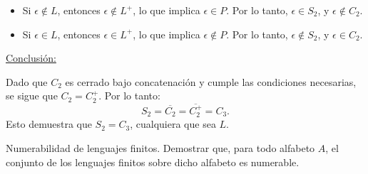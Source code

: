 \documentclass[12pt]{book} %
\begin{document}
\begin{solucion}
\begin{enumerate}[label=\alph*)]
    \begin{itemize}
         \item Si $\epsilon \notin L$, entonces $\epsilon \notin L^+$, lo que implica $\epsilon \in P$. Por lo tanto, $\epsilon \in S_2$, y $\epsilon \notin C_2$.
         \item Si $\epsilon \in L$, entonces $\epsilon \in L^+$, lo que implica $\epsilon \notin P$. Por lo tanto, $\epsilon \notin S_2$, y $\epsilon \in C_2$.
    \end{itemize}

    \underline{Conclusión:}

    Dado que $C_2$ es cerrado bajo concatenación y cumple las condiciones necesarias, se sigue que $C_2 = C_2^+$. Por lo tanto:
    \[
    S_2 = \overline{C_2} = \overline{C_2^+} = C_3.
    \]
    Esto demuestra que $S_2 = C_3$, cualquiera que sea $L$.
\end{enumerate}



\end{solucion}

\begin{ejercicio}
Numerabilidad de lenguajes finitos. Demostrar que, para todo alfabeto $A$, el conjunto de los lenguajes finitos sobre dicho alfabeto es numerable.
\end{ejercicio}
\end{document}
